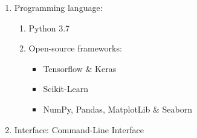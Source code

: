 \begin{enumerate}
    \item Programming language:
    \begin{enumerate}
        \item Python 3.7
        \item Open-source frameworks:
        \begin{itemize}
            \item Tensorflow \& Keras
            \item Scikit-Learn
            \item NumPy, Pandas, MatplotLib \& Seaborn
        \end{itemize}
    \end{enumerate}
    
    \item Interface: Command-Line Interface
\end{enumerate}
